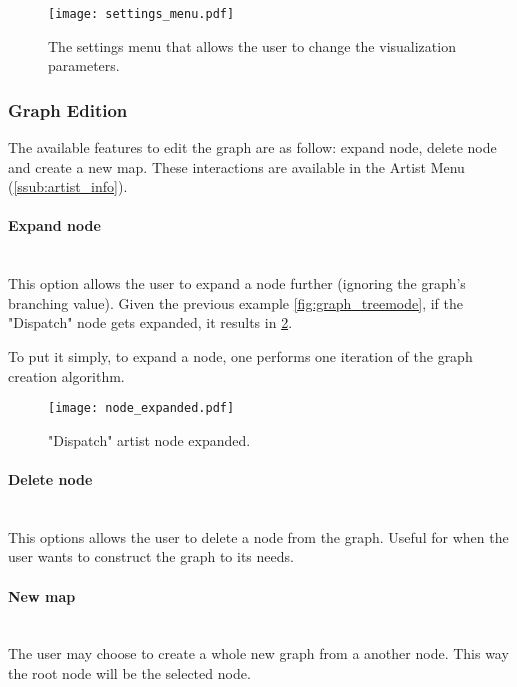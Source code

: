     \begin{figure}
      \begin{center}
        \texttt{[image: settings\_menu.pdf]}
      \end{center}
      \caption{The settings menu that allows the user to change the visualization parameters.}
      \label{fig:settings_menu} 
    \end{figure}


    \subsubsection{Graph Edition} %
      \label{ssub:edition}

      The available features to edit the graph are as follow: expand node, delete node and create a new map.
      These interactions are available in the Artist Menu (\ref{ssub:artist_info}).

      \paragraph{Expand node} \hfill \\
      This option allows the user to expand a node further (ignoring the graph's branching value).
      Given the previous example \ref{fig:graph_treemode}, if the "Dispatch" node gets expanded, it results in \ref{fig:node_expanded}.

      To put it simply, to expand a node, one performs one iteration of the graph creation algorithm.

      \begin{figure}[tb]
         \begin{center}
           \texttt{[image: node\_expanded.pdf]}
         \end{center}
         \caption{"Dispatch" artist node expanded.}
         \label{fig:node_expanded}
      \end{figure}

      \paragraph{Delete node} \hfill \\
      This options allows the user to delete a node from the graph.
      Useful for when the user wants to construct the graph to its needs.

      \paragraph{New map} \hfill \\
      The user may choose to create a whole new graph from a another node.
      This way the root node will be the selected node.


